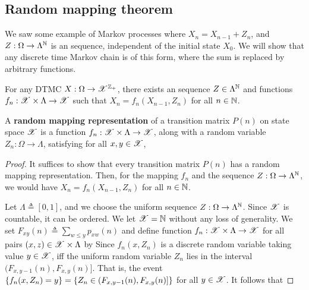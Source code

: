 \documentclass[letterpaper,10pt,english]{article}
\begin{document}
\subsection{Random mapping theorem}
We saw some example of Markov processes where $X_n = X_{n-1} + Z_n$, 
and $Z:\Omega\to\Lambda^{\mathbb{N}}$ is an \iid sequence, independent of the initial state $X_0$. 
We will show that any discrete time Markov chain is of this form, 
where the sum is replaced by arbitrary functions.  
\begin{thm} 
For any DTMC $X:\Omega\to\mathscr{X}^{\mathbb{Z}_+}$, there exists an \iid sequence $Z \in \Lambda^{\mathbb{N}}$ and  functions $f_n: \mathscr{X} \times \Lambda \to \mathscr{X}$ such that $X_{n} = f_n(X_{n-1}, Z_{n})$ for all $n \in \mathbb{N}$. 
\end{thm}
\begin{rem}
A \textbf{random mapping representation} of a transition matrix $P(n)$ on state space $\mathscr{X}$ is a function $f_n: \mathscr{X} \times \Lambda \to \mathscr{X}$, along with a random variable $Z_n:\Omega\to\Lambda$, satisfying for all $x,y \in \mathscr{X}$, 
\end{rem}
\begin{proof}
It suffices to show that every transition matrix $P(n)$ has a random mapping representation. 
Then, for the mapping $f_n$ and the \iid sequence $Z:\Omega\to\Lambda^{\mathbb{N}}$, we would have $X_n = f_n(X_{n-1}, Z_n)$ for all $n \in \mathbb{N}$. 

Let $\Lambda \triangleq [0,1]$, and we choose the \iid uniform sequence $Z:\Omega\to\Lambda^{\mathbb{N}}$. %
Since $\mathscr{X}$ is countable, it can be ordered. 
We let $\mathscr{X} = \mathbb{N}$ without any loss of generality. 
We set $F_{xy}(n) \triangleq \sum_{w \le y}p_{xw}(n)$ and define function $f_n:\mathscr{X}\times\Lambda\to\mathscr{X}$ for all pairs $(x,z)\in\mathscr{X}\times\Lambda$ by 
Since $f_n(x,Z_n)$ is a discrete random variable taking value $y \in \mathscr{X}$, iff the uniform random variable $Z_n$ lies in the interval $(F_{x, y-1}(n), F_{x,y}(n)]$. 
That is, the event $\left\{f_n(x,Z_n) = y\right\} = \left\{Z_n \in (F_{x, y-1}(n), F_{x,y}(n)]\right\}$ for all $y \in \mathscr{X}$. 
It follows that 
\end{proof}
\end{document}
